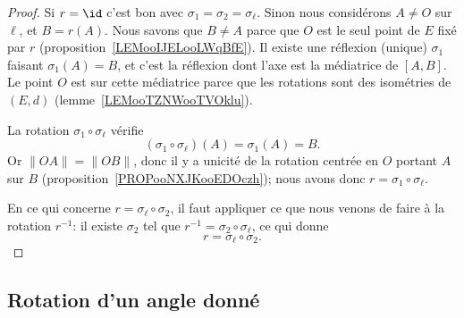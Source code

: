\begin{proof}
	Si \( r=\id\) c'est bon avec \( \sigma_1=\sigma_2=\sigma_{\ell}\). Sinon nous considérons \( A\neq O\) sur \( \ell\), et \( B=r(A)\). Nous savons que \( B\neq A\) parce que \( O\) est le seul point de \( E\) fixé par \( r\) (proposition~\ref{LEMooIJELooLWqBfE}). Il existe une réflexion (unique) \( \sigma_1\) faisant \( \sigma_1(A)=B\), et c'est la réflexion dont l'axe est la médiatrice de \( [A,B]\). Le point \( O\) est sur cette médiatrice parce que les rotations sont des isométries de \( (E,d)\) (lemme~\ref{LEMooTZNWooTVOklu}).

	La rotation \( \sigma_1\circ \sigma_{\ell}\) vérifie
	\begin{equation}
		(\sigma_1\circ\sigma_{\ell})(A)=\sigma_1(A)=B.
	\end{equation}
	Or \( \| OA \|=\| OB \|\), donc il y a unicité de la rotation centrée en \( O\) portant \( A\) sur \( B\) (proposition~\ref{PROPooNXJKooEDOczh}); nous avons donc \( r=\sigma_1\circ\sigma_{\ell}\).

	En ce qui concerne \( r=\sigma_{\ell}\circ\sigma_2\), il faut appliquer ce que nous venons de faire à la rotation \( r^{-1}\): il existe \( \sigma_2\) tel que \( r^{-1}=\sigma_2\circ\sigma_{\ell}\), ce qui donne
	\begin{equation}
		r=\sigma_{\ell}\circ\sigma_2.
	\end{equation}
\end{proof}

\subsection{Rotation d'un angle donné}


